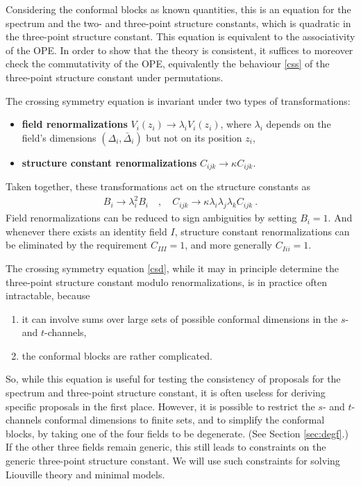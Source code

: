 \documentclass[12pt, a4paper, notitlepage, twoside]{report}
\numberwithin{equation}{section}
\theoremstyle{break}
\begin{document}
Considering the conformal blocks as known quantities, this is an equation for the spectrum and the two- and three-point structure constants, which is quadratic in the three-point structure constant.
This equation is equivalent to the associativity of the OPE. In order to show that the theory is consistent, it suffices to moreover check the commutativity of the OPE, equivalently the behaviour \eqref{css} of the three-point structure constant under permutations. 

The crossing symmetry equation is invariant under two types  of transformations: 
\begin{itemize}
\item \textbf{field renormalizations} $V_i(z_i)\to \lambda_i V_i(z_i)$, where $\lambda_i$ depends on the field's dimensions $(\Delta_i,\bar\Delta_i)$ but not on its position $z_i$,
 \item \textbf{structure constant renormalizations} $C_{ijk}\to \kappa C_{ijk}$. 
\end{itemize}
Taken together, these transformations act on the structure constants as 
\begin{align}
 B_i \to \lambda_i^2 B_i \quad , \quad C_{ijk} \to \kappa \lambda_i\lambda_j\lambda_k C_{ijk}\ .
\end{align}
Field renormalizations can be reduced to sign ambiguities by setting $B_i=1$. 
And 
whenever there exists an identity field $I$, structure constant renormalizations can be eliminated by the requirement $C_{III}=1$, and more generally $C_{Iii}=1$.

The crossing symmetry equation \eqref{csd}, while it may in principle determine the three-point structure constant modulo renormalizations, is in practice often intractable, because
\begin{enumerate}
 \item it can involve sums over large sets of possible conformal dimensions in the $s$- and $t$-channels, 
 \item the conformal blocks are rather complicated. 
\end{enumerate}
So, while this equation is useful for testing the consistency of proposals for the spectrum and three-point structure constant, it is often useless for deriving specific proposals in the first place. However, it is possible to restrict the $s$- and $t$-channels conformal dimensions to finite sets, and to simplify the conformal blocks, by taking one of the four fields to be degenerate. (See Section \ref{sec:degf}.) If the other three fields remain generic, this still leads to constraints on the generic three-point structure constant. We will use such constraints for solving Liouville theory and minimal models.
\end{document}
